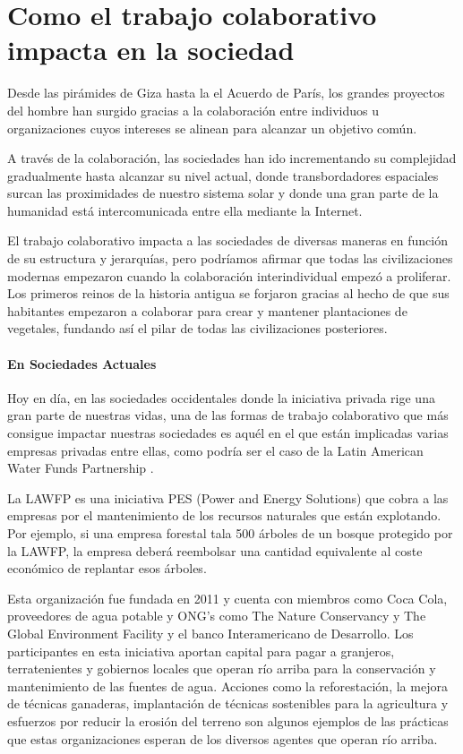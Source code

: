 \section{Como el trabajo colaborativo impacta en la sociedad}\label{sec:impact_on_society}

Desde las pirámides de Giza hasta la el Acuerdo de París, los grandes proyectos del hombre han surgido gracias a la colaboración entre individuos u organizaciones cuyos intereses se alinean para alcanzar un objetivo común.

A través de la colaboración, las sociedades han ido incrementando su complejidad gradualmente hasta alcanzar su nivel actual, donde transbordadores espaciales surcan las proximidades de nuestro sistema solar y donde una gran parte de la humanidad está intercomunicada entre ella mediante la Internet.

El trabajo colaborativo impacta a las sociedades de diversas maneras en función de su estructura y jerarquías, pero podríamos afirmar que todas las civilizaciones modernas empezaron cuando la colaboración interindividual empezó a proliferar. Los primeros reinos de la historia antigua se forjaron gracias al hecho de que sus habitantes empezaron a colaborar para crear y mantener plantaciones de vegetales, fundando así el pilar de todas las civilizaciones posteriores.

\paragraph{En Sociedades Actuales}

Hoy en día, en las sociedades occidentales donde la iniciativa privada rige una gran parte de nuestras vidas, una de las formas de trabajo colaborativo que más consigue impactar nuestras sociedades es aquél en el que están implicadas varias empresas privadas entre ellas, como podría ser el caso de la Latin American Water Funds Partnership \cite{ram}.

La LAWFP es una iniciativa PES (Power and Energy Solutions) que cobra a las empresas por el mantenimiento de los recursos naturales que están explotando. Por ejemplo, si una empresa forestal tala 500 árboles de un bosque protegido por la LAWFP, la empresa deberá reembolsar una cantidad equivalente al coste económico de replantar esos árboles.

Esta organización fue fundada en 2011 y cuenta con miembros como Coca Cola, proveedores de agua potable y ONG’s como The Nature Conservancy y The Global Environment Facility y el banco Interamericano de Desarrollo. Los participantes en esta iniciativa aportan capital para pagar a granjeros, terratenientes y gobiernos locales que operan río arriba para la conservación y mantenimiento de las fuentes de agua. Acciones como la reforestación, la mejora de técnicas ganaderas, implantación de técnicas sostenibles para la agricultura y esfuerzos por reducir la erosión del terreno son algunos ejemplos de las prácticas que estas organizaciones esperan de los diversos agentes que operan río arriba.


